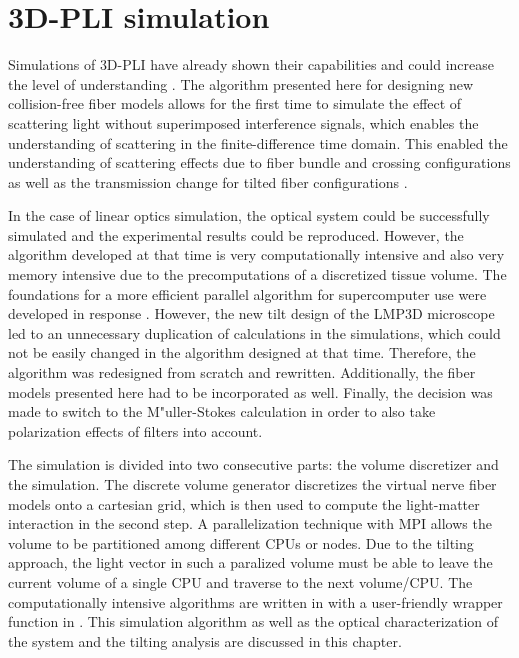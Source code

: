 \cleardoublepage
\setcounter{chapter}{4}
\chapter{\acs{3D-PLI} simulation}
\label{cha:sof:simulation}
%
Simulations of \ac{3D-PLI} have already shown their capabilities and could increase the level of understanding \cite{Dohmen2015,Menzel2015,Menzel2016,Menzel2020,Menzel2021,MenzelMaster,MenzelDissertation}.
The algorithm presented here for designing new collision-free fiber models allows for the first time to simulate the effect of scattering light without superimposed interference signals, which enables the understanding of scattering in the finite-difference time domain.
This enabled the understanding of scattering effects due to fiber bundle and crossing configurations as well as the transmission change for tilted fiber configurations \cite{MenzelDissertation,Menzel2020,Menzel2021}.
\par
% 
In the case of linear optics simulation, the optical system could be successfully simulated and the experimental results \cite{Dohmen2015,Menzel2016} could be reproduced.
However, the algorithm developed at that time is very computationally intensive and also very memory intensive due to the precomputations of a discretized tissue volume.
The foundations for a more efficient parallel algorithm for supercomputer use were developed in response \cite{Lucksch2016}.
However, the new tilt design of the LMP3D microscope led to an unnecessary duplication of calculations in the simulations, which could not be easily changed in the algorithm designed at that time.
Therefore, the algorithm was redesigned from scratch and rewritten.
Additionally, the fiber models presented here had to be incorporated as well.
Finally, the decision was made to switch to the M"{u}ller-Stokes calculation in order to also take polarization effects of filters into account.
\par
%
The simulation is divided into two consecutive parts: the volume discretizer and the simulation.
The discrete volume generator discretizes the virtual nerve fiber models onto a cartesian grid, which is then used to compute the light-matter interaction in the second step.
A parallelization technique with \ac{MPI} allows the volume to be partitioned among different \acp{CPU} or nodes.
Due to the tilting approach, the light vector in such a paralized volume must be able to leave the current volume of a single \ac{CPU} and traverse to the next volume/\ac{CPU}.
The computationally intensive algorithms are written in \cpp{} with a user-friendly wrapper function in \python{}.
This simulation algorithm as well as the optical characterization of the system and the tilting analysis are discussed in this chapter.
%
% 
% 
